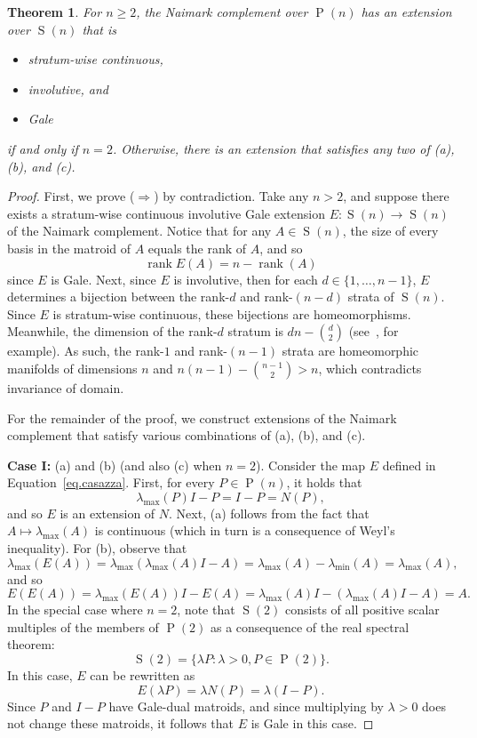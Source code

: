 \documentclass[12pt]{article}
\theoremstyle{plain}
\newtheorem{thm}{Theorem}
\theoremstyle{definition}
\theoremstyle{remark}
\newcommand{\oP}{\operatorname{P}}
\newcommand{\oS}{\operatorname{S}}
\begin{document}
\begin{thm}
\label{thm.main}
For $n\geq2$, the Naimark complement over $\oP(n)$ has an extension over $\oS(n)$ that is
\begin{itemize}
\item[(a)] stratum-wise continuous,
\item[(b)] involutive, and
\item[(c)] Gale
\end{itemize}
if and only if $n=2$.
Otherwise, there is an extension that satisfies any two of (a), (b), and (c).
\end{thm}

\begin{proof}
First, we prove ($\Rightarrow$) by contradiction.
Take any $n>2$, and suppose there exists a stratum-wise continuous involutive Gale extension $E\colon\oS(n)\to\oS(n)$ of the Naimark complement.
Notice that for any $A\in\oS(n)$, the size of every basis in the matroid of $A$ equals the rank of $A$, and so
\[
\operatorname{rank}E(A)
=n-\operatorname{rank}(A)
\]
since $E$ is Gale.
Next, since $E$ is involutive, then for each $d\in\{1,\ldots,n-1\}$, $E$ determines a bijection between the rank-$d$ and rank-$(n-d)$ strata of $\oS(n)$.
Since $E$ is stratum-wise continuous, these bijections are homeomorphisms.
Meanwhile, the dimension of the rank-$d$ stratum is $dn-\binom{d}{2}$ (see~\cite{BonnabelS:10}, for example).
As such, the rank-$1$ and rank-$(n-1)$ strata are homeomorphic manifolds of dimensions $n$ and $n(n-1)-\binom{n-1}{2}>n$, which contradicts invariance of domain.

For the remainder of the proof, we construct extensions of the Naimark complement that satisfy various combinations of (a), (b), and (c).

\medskip
\noindent
\textbf{Case I:} (a) and (b) (and also (c) when $n=2$).
Consider the map $E$ defined in Equation~\eqref{eq.casazza}.
First, for every $P\in\oP(n)$, it holds that
\[
\lambda_{\max}(P)I-P
=I-P
=N(P),
\]
and so $E$ is an extension of $N$.
Next, (a) follows from the fact that $A\mapsto\lambda_{\max}(A)$ is continuous (which in turn is a consequence of Weyl's inequality).
For (b), observe that
\[
\lambda_{\max}(E(A))
=\lambda_{\max}(\lambda_{\max}(A)I-A)
=\lambda_{\max}(A)-\lambda_{\min}(A)
=\lambda_{\max}(A),
\]
and so
\[
E(E(A))
=\lambda_{\max}(E(A))I-E(A)
=\lambda_{\max}(A)I-(\lambda_{\max}(A)I-A)
=A.
\]
In the special case where $n=2$, note that $\oS(2)$ consists of all positive scalar multiples of the members of $\oP(2)$ as a consequence of the real spectral theorem:
\[
\oS(2)
=\{\lambda P:\lambda>0,P\in\oP(2)\}.
\]
In this case, $E$ can be rewritten as
\[
E(\lambda P)=\lambda N(P)=\lambda(I-P).
\]
Since $P$ and $I-P$ have Gale-dual matroids, and since multiplying by $\lambda>0$ does not change these matroids, it follows that $E$ is Gale in this case.


\end{proof}
\end{document}
